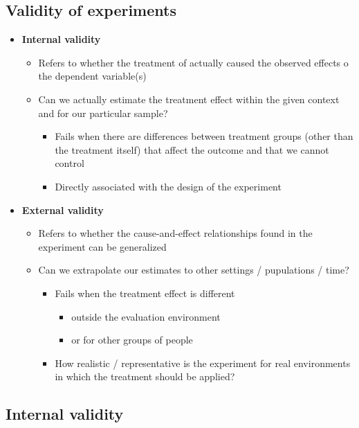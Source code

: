 \documentclass[10pt]{article}
\begin{document}
\subsection{Validity of experiments}
\begin{itemize}
    \item \textbf{Internal validity}
    \begin{itemize}
        \item Refers to whether the treatment of actually caused the observed effects o the dependent variable(s)
        \item Can we actually estimate the treatment effect within the given context and for our particular sample?
        \begin{itemize}
            \item Fails when there are differences between treatment groups (other than the treatment itself) that affect the outcome and that we cannot control 
            \item Directly associated with the design of the experiment
        \end{itemize}
    \end{itemize}
    \item \textbf{External validity}
    \begin{itemize}
        \item Refers to whether the cause-and-effect relationships found in the experiment can be generalized 
        \item Can we extrapolate our estimates to other settings / pupulations / time?
        \begin{itemize}
            \item Fails when the treatment effect is different
            \begin{itemize}
                \item outside the evaluation environment
                \item or for other groups of people 
            \end{itemize}
            \item How realistic / representative is the experiment for real environments in which the treatment should be applied?
        \end{itemize}
    \end{itemize}
\end{itemize}
\newpage 
\subsection{Internal validity}
\end{document}
